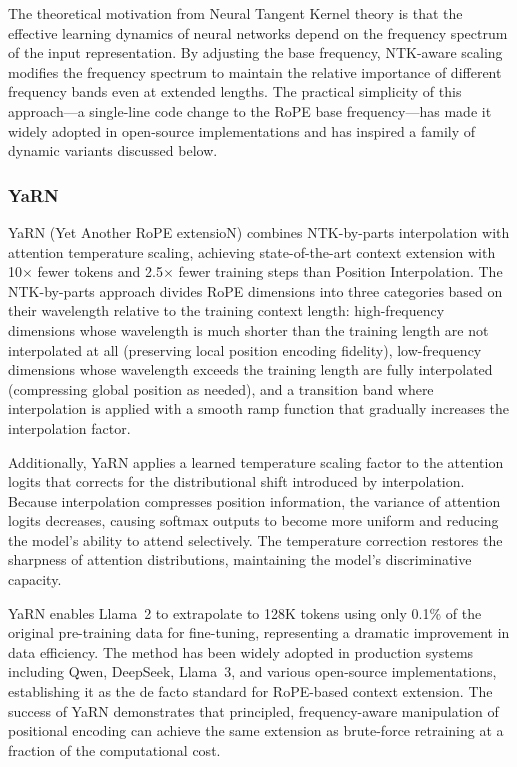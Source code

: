 \documentclass[11pt,letterpaper]{article}
\begin{document}
The theoretical motivation from Neural Tangent Kernel theory is that the effective learning dynamics of neural networks depend on the frequency spectrum of the input representation. By adjusting the base frequency, NTK-aware scaling modifies the frequency spectrum to maintain the relative importance of different frequency bands even at extended lengths. The practical simplicity of this approach---a single-line code change to the RoPE base frequency---has made it widely adopted in open-source implementations and has inspired a family of dynamic variants discussed below.

\subsubsection{YaRN}

YaRN (Yet Another RoPE extensioN) \cite{peng2024yarn} combines NTK-by-parts interpolation with attention temperature scaling, achieving state-of-the-art context extension with 10$\times$ fewer tokens and 2.5$\times$ fewer training steps than Position Interpolation. The NTK-by-parts approach divides RoPE dimensions into three categories based on their wavelength relative to the training context length: high-frequency dimensions whose wavelength is much shorter than the training length are not interpolated at all (preserving local position encoding fidelity), low-frequency dimensions whose wavelength exceeds the training length are fully interpolated (compressing global position as needed), and a transition band where interpolation is applied with a smooth ramp function that gradually increases the interpolation factor.

Additionally, YaRN applies a learned temperature scaling factor to the attention logits that corrects for the distributional shift introduced by interpolation. Because interpolation compresses position information, the variance of attention logits decreases, causing softmax outputs to become more uniform and reducing the model's ability to attend selectively. The temperature correction restores the sharpness of attention distributions, maintaining the model's discriminative capacity.

YaRN enables Llama~2 to extrapolate to 128K tokens using only 0.1\% of the original pre-training data for fine-tuning, representing a dramatic improvement in data efficiency. The method has been widely adopted in production systems including Qwen, DeepSeek, Llama~3, and various open-source implementations, establishing it as the de facto standard for RoPE-based context extension. The success of YaRN demonstrates that principled, frequency-aware manipulation of positional encoding can achieve the same extension as brute-force retraining at a fraction of the computational cost.
\end{document}
